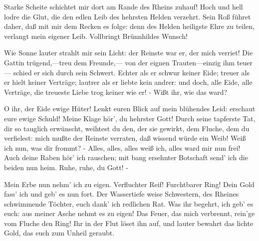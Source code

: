 \begin{drama}
\Brunnhildespeaks



Starke Scheite schichtet mir dort
am Rande des Rheins zuhauf!
Hoch und hell lodre die Glut,
die den edlen Leib
des hehrsten Helden verzehrt.
Sein Roß führet daher,
daß mit mir dem Recken es folge:
denn des Helden heiligste Ehre zu teilen,
verlangt mein eigener Leib.
Vollbringt Brünnhildes Wunsch!
 




\Brunnhildespeaks



Wie Sonne lauter strahlt mir sein Licht:
der Reinste war er, der mich verriet!
Die Gattin trügend,---treu dem Freunde,---
von der eignen Trauten---einzig ihm teuer---
schied er sich durch sein Schwert.
Echter als er schwur keiner Eide;
treuer als er hielt keiner Verträge;
lautrer als er liebte kein andrer:
und doch, alle Eide, alle Verträge,
die treueste Liebe trog keiner wie er! -
Wißt ihr, wie das ward?


O ihr, der Eide ewige Hüter!
Lenkt euren Blick auf mein blühendes Leid:
erschaut eure ewige Schuld!
Meine Klage hör', du hehrster Gott!
Durch seine tapferste Tat,
dir so tauglich erwünscht,
weihtest du den, der sie gewirkt,
dem Fluche, dem du verfielest:
mich mußte der Reinste verraten,
daß wissend würde ein Weib!
Weiß ich nun, was dir frommt? -
Alles, alles, alles weiß ich,
alles ward mir nun frei!
Auch deine Raben hör' ich rauschen;
mit bang ersehnter Botschaft
send' ich die beiden nun heim.
Ruhe, ruhe, du Gott! -




Mein Erbe nun nehm' ich zu eigen.
Verfluchter Reif! Furchtbarer Ring!
Dein Gold fass' ich und geb' es nun fort.
Der Wassertiefe weise Schwestern,
des Rheines schwimmende Töchter,
euch dank' ich redlichen Rat.
Was ihr begehrt, ich geb' es euch:
aus meiner Asche nehmt es zu eigen!
Das Feuer, das mich verbrennt,
rein'ge vom Fluche den Ring!
Ihr in der Flut löset ihn auf,
und lauter bewahrt das lichte Gold,
das euch zum Unheil geraubt.
 



\end{drama}
